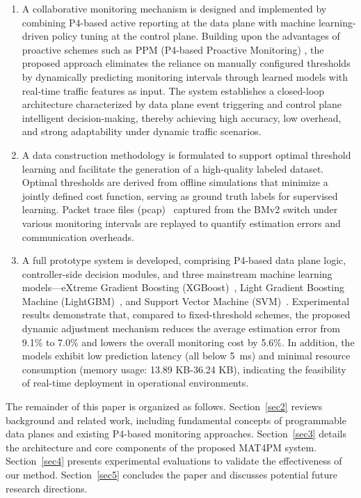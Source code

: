 \begin{enumerate}
    
    \item A collaborative monitoring mechanism is designed and implemented by combining P4-based active reporting at the data plane with machine learning-driven policy tuning at the control plane. 
    Building upon the advantages of proactive schemes such as PPM (P4-based Proactive Monitoring) \cite{10623873}, the proposed approach eliminates the reliance on manually configured thresholds by dynamically predicting monitoring intervals through learned models with real-time traffic features as input. 
    The system establishes a closed-loop architecture characterized by data plane event triggering and control plane intelligent decision-making, thereby achieving high accuracy, low overhead, and strong adaptability under dynamic traffic scenarios.
    
    \item A data construction methodology is formulated to support optimal threshold learning and facilitate the generation of a high-quality labeled dataset. 
    Optimal thresholds are derived from offline simulations that minimize a jointly defined cost function, serving as ground truth labels for supervised learning. 
    Packet trace files (pcap)~\cite{pcap} captured from the BMv2 switch under various monitoring intervals are replayed to quantify estimation errors and communication overheads.
    
    \item A full prototype system is developed, comprising P4-based data plane logic, controller-side decision modules, and three mainstream machine learning models---eXtreme Gradient Boosting (XGBoost)~\cite{XGBoost}, Light Gradient Boosting Machine (LightGBM)~\cite{LightGBM}, and Support Vector Machine (SVM)~\cite{SVM}. 
    Experimental results demonstrate that, compared to fixed-threshold schemes, the proposed dynamic adjustment mechanism reduces the average estimation error from 9.1\% to 7.0\% and lowers the overall monitoring cost by 5.6\%. 
    In addition, the models exhibit low prediction latency (all below 5~ms) and minimal resource consumption (memory usage: 13.89 KB-36.24 KB), indicating the feasibility of real-time deployment in operational environments.
    
\end{enumerate}

The remainder of this paper is organized as follows. Section~\ref{sec2} reviews background and related work, including fundamental concepts of programmable data planes and existing P4-based monitoring approaches. Section~\ref{sec3} details the architecture and core components of the proposed MAT4PM system. Section~\ref{sec4} presents experimental evaluations to validate the effectiveness of our method. Section~\ref{sec5} concludes the paper and discusses potential future research directions.

